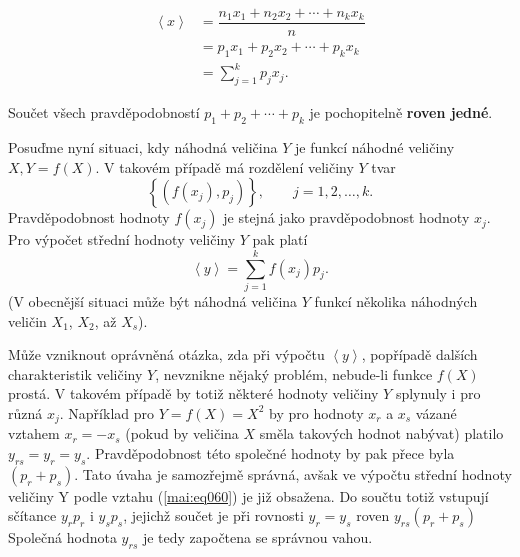     \begin{mdframed}[style=highlight]
      \begin{align}\label{mai:eq059}
        \left\langle x \right\rangle 
          &= \dfrac{n_1x_1 + n_2x_2 + \cdots + n_kx_k}{n}  \nonumber \\
          &= p_1x_1 + p_2x_2 + \cdots + p_kx_k             \nonumber \\
          &= \sum_{j=1}^{k}p_jx_j.
      \end{align}
    \end{mdframed}
    Součet všech pravděpodobností \(p_1 + p_2 + \cdots + p_k\) je pochopitelně \textbf{roven jedné}.

    
    
    Posuďme nyní situaci, kdy náhodná veličina \(Y\) je funkcí náhodné veličiny \(X, Y = f(X)\).
    V takovém případě má rozdělení veličiny \(Y\) tvar
    \begin{equation*}
      \left\lbrace (f(x_j), p_j)\right\rbrace, \qquad j = 1, 2, \ldots, k.
    \end{equation*}
    Pravděpodobnost hodnoty \(f(x_j)\) je stejná jako pravděpodobnost hodnoty \(x_j\). Pro výpočet
    střední hodnoty veličiny \(Y\) pak platí
    \begin{equation}\label{mai:eq060}
      \left\langle y \right\rangle = \sum_{j=1}^{k}f(x_j)p_j.
    \end{equation}
    (V obecnější situaci může být náhodná veličina \(Y\) funkcí několika náhodných veličin \(X_1\), 
    \(X_2\), až \(X_s\)).
    
    Může vzniknout oprávněná otázka, zda při výpočtu \(\left\langle y \right\rangle\), popřípadě 
    dalších charakteristik veličiny \(Y\), nevznikne nějaký problém, nebude-li funkce \(f(X)\) 
    prostá. V takovém případě by totiž některé hodnoty veličiny \(Y\) splynuly i pro různá \(x_j\). 
    Například pro \(Y = f(X) = X^2\) by pro hodnoty \(x_r\) a \(x_s\) vázané vztahem \(x_r = -x_s\) 
    (pokud by veličina \(X\) směla takových hodnot nabývat) platilo \(y_{rs} = y_r = y_s\). 
    Pravděpodobnost této společné hodnoty by pak přece byla \((p_r + p_s)\). Tato úvaha je 
    samozřejmě správná, avšak ve výpočtu střední hodnoty veličiny Y
    podle vztahu (\ref{mai:eq060}) je již obsažena. Do součtu totiž vstupují sčítance \(y_rp_r\) i 
    \(y_sp_s\), jejichž součet je při rovnosti \(y_r = y_s\) roven \(y_{rs}(p_r +p_s)\) Společná 
    hodnota \(y_{rs}\) je tedy započtena se správnou vahou.
    
